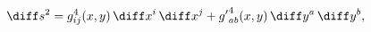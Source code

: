 \begin{equation}
   \diff s^2 = g^4_{ij}(x,y)\,\diff x^i \,\diff x^j 
      + {g'}^4_{ab}(x,y)\,\diff y^a \,\diff y^b ,
\label{susu2metric}
\end{equation}

